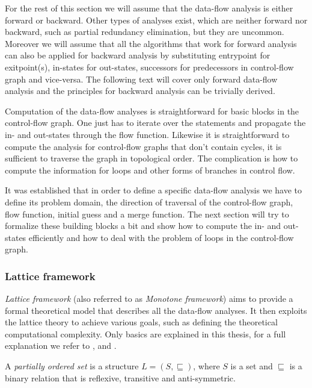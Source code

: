 For the rest of this section we will assume that the data-flow analysis is either forward or backward. Other types of analyses exist, which are neither forward nor backward, such as partial redundancy elimination, but they are uncommon. Moreover we will assume that all the algorithms that work for forward analysis can also be applied for backward analysis by substituting entrypoint for exitpoint(s), in-states for out-states, successors for predecessors in control-flow graph and vice-versa. The following text will cover only forward data-flow analysis and the principles for backward analysis can be trivially derived.

Computation of the data-flow analyses is straightforward for basic blocks in the control-flow graph. One just has to iterate over the statements and propagate the in- and out-states through the flow function. Likewise it is straightforward to compute the analysis for control-flow graphs that don't contain cycles, it is sufficient to traverse the graph in topological order. The complication is how to compute the information for loops and other forms of branches in control flow.

It was established that in order to define a specific data-flow analysis we have to define its problem domain, the direction of traversal of the control-flow graph, flow function, initial guess and a merge function. The next section will try to formalize these building blocks a bit and show how to compute the in- and out- states efficiently and how to deal with the problem of loops in the control-flow graph.

\subsubsection{Lattice framework}

\emph{Lattice framework} (also referred to as \emph{Monotone framework}) aims to provide a formal theoretical model that describes all the data-flow analyses. It then exploits the lattice theory to achieve various goals, such as defining the theoretical computational complexity. Only basics are explained in this thesis, for a full explanation we refer to \citet{Nielson1999}, \citet{Muchnick1998} and \citet{Aho1986}.

\begin{definition}
A \emph{partially ordered set} is a structure $L = (S, \sqsubseteq)$, where $S$ is a set and $\sqsubseteq$ is a binary relation that is reflexive, transitive and anti-symmetric.
\end{definition}

